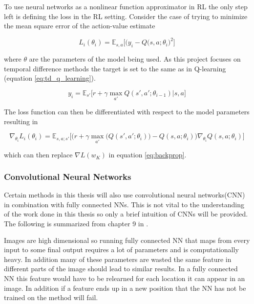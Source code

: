 To use neural networks as a nonlinear function approximator in RL the only step left is defining the loss in the RL setting. Consider the case of trying to minimize the mean square error of the action-value estimate

\begin{equation}
    L_i(\theta_i) = \mathbb{E}_{s,a}\Big[\big(y_i - Q(s,a;\theta_i\big)^2\Big]
\end{equation}

where $\theta$ are the parameters of the model being used. As this project focuses on temporal difference methods the target is set to the same as in Q-learning (equation \ref{eq:td_q_learning}).

\begin{equation}
    y_i = \mathbb{E}_{s'}\big[r+\gamma \max_{a'} Q(s', a'; \theta_{i-1})|s,a\big]
    \label{eq:Q_target}
\end{equation}

The loss function can then be differentiated with respect to the model parameters resulting in 

\begin{equation}
    \label{eq:RL_gradient_descent}
    \nabla_{\theta_i}L_i(\theta_i) = \mathbb{E}_{s,a; s'}\Bigg[\Bigg(r+\gamma\max_{a'}\bigg(Q(s',a';\theta_i)\bigg)-Q(s,a;\theta_i)\Bigg)\nabla_{\theta_i}Q(s,a;\theta_i)\Bigg]
\end{equation}

which can then replace $\nabla L(w_K)$ in equation \ref{eq:backprop}.

\subsubsection{Convolutional Neural Networks}

Certain methods in this thesis will also use convolutional neural networks(CNN) in combination with fully connected NNs. This is not vital to the understanding of the work done in this thesis so only a brief intuition of CNNs will be provided. The following is summarized from chapter 9 in \cite{goodfellow_2013}.

Images are high dimensional so running fully connected NN that maps from every input to some final output requires a lot of parameters and is computationally heavy. In addition many of these parameters are wasted the same feature in different parts of the image should lead to similar results. In a fully connected NN this feature would have to be relearned  for each location it can appear in an image. In addition if a feature ends up in a new position that the NN has not be trained on the method will fail.

